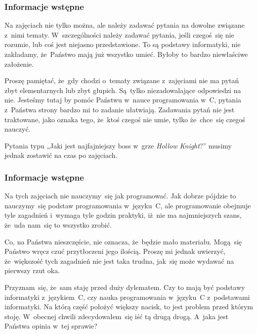\documentclass[10pt,t]{beamer}
\begin{document}
\begin{frame}
  \frametitle{Informacje wstępne}


  Na zajęciach nie tylko można, ale \alert{należy} zadawać pytania
  na dowolne związane z~nimi tematy. W~szczególności
  \alert{należy} zadawać pytania, jeśli czegoś~się nie rozumie, lub coś
  jest niejasno przedstawione. To są podstawy informatyki, \alert{nie}
  zakładamy, że~Państwo mają już wszystko umieć. Byłoby to bardzo
  niewłaściwe założenie.

  Proszę pamiętać, że~gdy chodzi o~tematy związane z~zajęciami
  \alert{nie} ma pytań zbyt elementarnych lub zbyt głupich. Są~tylko
  niezadowalające odpowiedzi na nie. Jesteśmy tutaj by pomóc
  Państwu w~nauce programowania w~C, pytania z~Państwa strony bardzo mi to
  zadanie ułatwiają. Zadawania pytań nie jest traktowane, jako oznaka tego,
  że~ktoś czegoś nie umie, tylko że~chce~się czegoś nauczyć.

  Pytania typu „Jaki jest najfajniejszy boss w~grze \textit{Hollow
    Knight}?” musimy jednak zostawić na czas po zajęciach.

\end{frame}





\begin{frame}
  \frametitle{Informacje wstępne}


  Na tych zajęciach \alert{nie} nauczymy~się jak programować. Jak dobrze
  pójdzie to nauczymy~się podstaw programowania w~języku~C, ale
  programowanie obejmuje tyle zagadnień i~wymaga tyle godzin praktyki,
  iż~nie ma najmniejszych szans, że~uda nam~się to wszystko zrobić.

  Co, na Państwa nieszczęście, nie oznacza, że~będzie mało materiału.
  Mogą~się Państwo wręcz czuć przytłoczeni jego ilością. Proszę mi jednak
  uwierzyć, że~większość tych zagadnień nie jest taka trudna, jak~się
  może wydawać na pierwszy rzut oka.

  Przyznam~się, że~sam staję przed duży dylematem. Czy to mają być
  \alert{podstawy informatyki} z~językiem~C, czy \alert{nauka
    programowania w~języku~C} z~podstawami informatyki. Na którą część
  położyć większy nacisk, to jest problem przed którym stoję. W~obecnej
  chwili zdecydowałem~się iść tą drugą drogą. A~jaka jest Państwa opinia
  w~tej sprawie?

\end{frame}
\end{document}
